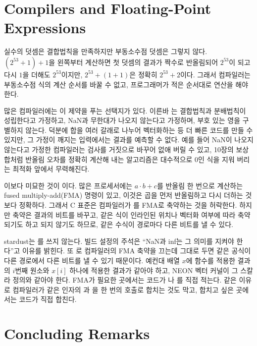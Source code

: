 \section{Compilers and Floating-Point Expressions}
\label{sec:compiler-fp}

실수의 덧셈은 결합법칙을 만족하지만 부동소수점 덧셈은 그렇지 않다. $(2^{53}+1)+1$을 왼쪽부터 계산하면 첫 덧셈의 결과가 짝수로 반올림되어 $2^{53}$이 되고 다시 $1$을 더해도 $2^{53}$이지만, $2^{53}+(1+1)$은 정확히 $2^{53}+2$이다. 그래서 컴파일러는 부동소수점 식의 계산 순서를 바꿀 수 없고, 프로그래머가 적은 순서대로 연산을 해야 한다.

많은 컴파일러에는 이 제약을 푸는 선택지가 있다. 이른바 는 결합법칙과 분배법칙이 성립한다고 가정하고, NaN과 무한대가 나오지 않는다고 가정하며, 부호 있는 영을 구별하지 않는다. 덕분에 합을 여러 갈래로 나누어 벡터화하는 등 더 빠른 코드를 만들 수 있지만, 그 가정이 깨지는 입력에서는 결과를 예측할 수 없다. 예를 들어 NaN이 나오지 않는다고 가정한 컴파일러는  검사를 거짓으로 바꾸어 없애 버릴 수 있고, 10장의 보상 합처럼 반올림 오차를 정확히 계산해 내는 알고리즘은 대수적으로 $0$인 식을 지워 버리는 최적화 앞에서 무력해진다.

이보다 미묘한 것이 이다. 많은 프로세서에는 $a\cdot b+c$를 반올림 한 번으로 계산하는 fused multiply-add(FMA) 명령이 있고, 이것은 곱을 먼저 반올림하고 다시 더하는 것보다 정확하다. 그래서 C 표준은 컴파일러가 를 FMA로 축약하는 것을 허락한다. 하지만 축약은 결과의 비트를 바꾸고, 같은 식이 인라인된 위치나 벡터화 여부에 따라 축약되기도 하고 되지 않기도 하므로, 같은 수식이 경로마다 다른 비트를 낼 수 있다.

\begin{instardust}
stardust는 를 쓰지 않는다. 빌드 설정의 주석은 ``NaN과 inf는 그 의미를 지켜야 한다''고 이유를 밝힌다. 또 로 컴파일러의 FMA 축약을 끄는데 그대로 두면 같은 공식이 다른 경로에서 다른 비트를 낼 수 있기 때문이다. 예컨대 배열 $x$에 함수를 적용한 결과의 $i$번째 원소와 $x[i]$ 하나에 적용한 결과가 같아야 하고, NEON 벡터 커널이 그 스칼라 정의와 같아야 한다. FMA가 필요한 곳에서는 코드가 나 를 직접 적는다. 같은 이유로 컴파일러가 같은 인자의 과 을 한 번의 호출로 합치는 것도 막고, 합치고 싶은 곳에서는 코드가 직접 합친다.
\end{instardust}

\section{Concluding Remarks}


